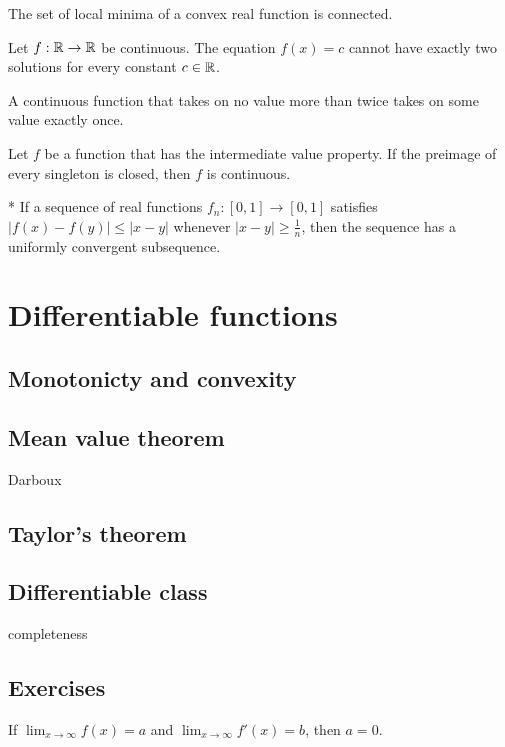\documentclass{../note}
\begin{document}
\begin{prb}
The set of local minima of a convex real function is connected.
\end{prb}

\begin{prb}
Let $f:\mathbb{R}\to\mathbb{R}$ be continuous.
The equation $f(x)=c$ cannot have exactly two solutions for every constant $c\in\mathbb{R}$.
\end{prb}

\begin{prb}
A continuous function that takes on no value more than twice takes on some value exactly once.
\end{prb}

\begin{prb}
Let $f$ be a function that has the intermediate value property.
If the preimage of every singleton is closed, then $f$ is continuous.
\end{prb}

\begin{prb}*
If a sequence of real functions $f_n\colon[0,1]\to[0,1]$ satisfies $|f(x)-f(y)|\le|x-y|$ whenever $|x-y|\ge\frac1n$, then the sequence has a uniformly convergent subsequence.
\end{prb}

\chapter{Differentiable functions}
\section{Monotonicty and convexity}
\section{Mean value theorem}
Darboux
\section{Taylor's theorem}
\section{Differentiable class}
completeness

\section*{Exercises}

\begin{prb}
If $\lim_{x\to\infty}f(x)=a$ and $\lim_{x\to\infty}f'(x)=b$, then $a=0$.
\end{prb}
\end{document}
